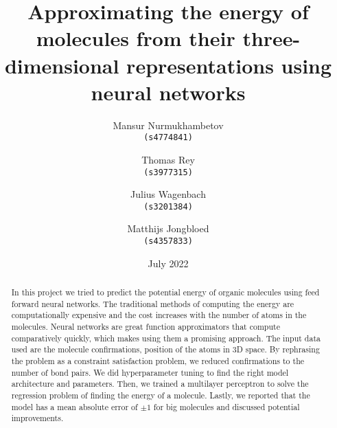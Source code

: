 \documentclass{article}
\title{Approximating the energy of molecules from their three-dimensional representations using neural networks}
\author{
    Mansur Nurmukhambetov \\ 
    \texttt{(s4774841)} 
    \and 
    Thomas Rey \\
    \texttt{(s3977315)} 
    \and 
    Julius Wagenbach \\ 
    \texttt{(s3201384)} 
    \and 
    Matthijs Jongbloed \\ 
    \texttt{(s4357833)}
}
\date{July 2022}
\begin{document}
\maketitle

\begin{abstract}
In this project we tried to predict the potential energy of organic molecules using feed forward neural networks. The traditional methods of computing the energy are computationally expensive and the cost increases with the number of atoms in the molecules. Neural networks are great function approximators that compute comparatively quickly, which makes using them a promising approach. The input data used are the molecule confirmations, position of the atoms in 3D space. By rephrasing the problem as a constraint satisfaction problem, we reduced confirmations to the number of bond pairs. We did hyperparameter tuning to find the right model architecture and parameters. Then, we trained a multilayer perceptron to solve the regression problem of finding the energy of a molecule. Lastly, we reported that the model has a mean absolute error of $\pm 1$ for big molecules and discussed potential improvements.
\end{abstract}


\clearpage

\tableofcontents
\end{document}
